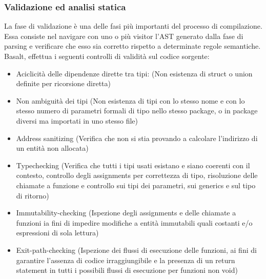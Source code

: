 \subsubsection{Validazione ed analisi statica}
La fase di validazione è una delle fasi più importanti del processo di compilazione. Essa consiste 
nel navigare con uno o più visitor l'AST generato dalla fase di parsing e verificare che esso sia
corretto rispetto a determinate regole semantiche. \\

Basalt, effettua i seguenti controlli di validità sul codice sorgente:
\begin{itemize}
    \item Aciclicità delle dipendenze dirette tra tipi: (Non esistenza di struct o union definite per ricorsione diretta)
    
    \item Non ambiguità dei tipi (Non esistenza di tipi con lo stesso nome e con lo stesso numero di parametri 
    formali di tipo nello stesso package, o in package diversi ma importati in uno stesso file)

    \item Address sanitizing (Verifica che non si stia provando a calcolare l'indirizzo di un entità non allocata)

    \item Typechecking (Verifica che tutti i tipi usati esistano e siano coerenti con il contesto, controllo degli 
    assignments per correttezza di tipo, risoluzione delle chiamate a funzione e controllo sui tipi dei parametri, sui 
    generics e sul tipo di ritorno)

    \item Immutability-checking (Ispezione degli assignments e delle chiamate a funzioni ia fini di impedire
    modifiche a entità immutabili quali costanti e/o espressioni di sola lettura)

    \item Exit-path-checking (Ispezione dei flussi di esecuzione delle funzioni, ai fini di garantire l'assenza di 
    codice irraggiungibile e la presenza di un return statement in tutti i possibili flussi di esecuzione per funzioni 
    non void)
\end{itemize}